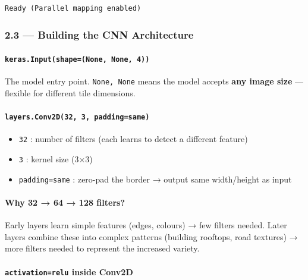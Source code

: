 \documentclass[11pt]{article}
\providecommand{\tightlist}{%
      \setlength{\itemsep}{0pt}\setlength{\parskip}{0pt}}
\begin{document}
    \begin{Verbatim}[commandchars=\\\{\}]
  Ready (Parallel mapping enabled)
    \end{Verbatim}

    \subsubsection{2.3 --- Building the CNN
Architecture}\label{building-the-cnn-architecture}

\paragraph{\texorpdfstring{\texttt{keras.Input(shape=(None,\ None,\ 4))}}{keras.Input(shape=(None, None, 4))}}\label{keras.inputshapenone-none-4}

The model entry point. \texttt{None,\ None} means the model accepts
\textbf{any image size} --- flexible for different tile dimensions.

\paragraph{\texorpdfstring{\texttt{layers.Conv2D(32,\ 3,\ padding=\textquotesingle{}same\textquotesingle{})}}{layers.Conv2D(32, 3, padding=\textquotesingle same\textquotesingle)}}\label{layers.conv2d32-3-paddingsame}

\begin{itemize}
\tightlist
\item
  \texttt{32} : number of filters (each learns to detect a different
  feature)
\item
  \texttt{3} : kernel size (3×3)
\item
  \texttt{padding=\textquotesingle{}same\textquotesingle{}} : zero-pad
  the border → output same width/height as input
\end{itemize}

\paragraph{Why 32 → 64 → 128 filters?}\label{why-32-64-128-filters}

Early layers learn simple features (edges, colours) → few filters
needed. Later layers combine these into complex patterns (building
rooftops, road textures) → more filters needed to represent the
increased variety.

\paragraph{\texorpdfstring{\texttt{activation=\textquotesingle{}relu\textquotesingle{}}
inside
Conv2D}{activation=\textquotesingle relu\textquotesingle{} inside Conv2D}}\label{activationrelu-inside-conv2d}
\end{document}
